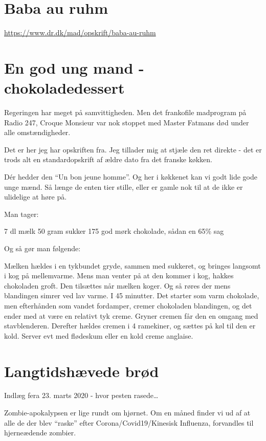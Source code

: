 \documentclass[
]{book}
\begin{document}
\hypertarget{baba-au-ruhm}{%
\section{Baba au ruhm}\label{baba-au-ruhm}}

\url{https://www.dr.dk/mad/opskrift/baba-au-ruhm}

\hypertarget{en-god-ung-mand---chokoladedessert}{%
\section{En god ung mand - chokoladedessert}\label{en-god-ung-mand---chokoladedessert}}

Regeringen har meget på samvittigheden. Men det frankofile madprogram på Radio 247, Croque Monsieur var nok stoppet med Master Fatmans død under alle omstændigheder.

Det er her jeg har opskriften fra. Jeg tillader mig at stjæle den ret direkte - det er trods alt en standardopskrift af ældre dato fra det franske køkken.

Dér hedder den ``Un bon jeune homme''. Og her i køkkenet kan vi godt lide gode unge mænd. Så længe de enten tier stille, eller er gamle nok til at de ikke er ulidelige at høre på.

Man tager:

7 dl mælk
50 gram sukker
175 god mørk chokolade, sådan en 65\% sag

Og så gør man følgende:

Mælken hældes i en tykbundet gryde, sammen med sukkeret, og bringes langsomt i kog på mellemvarme.
Mens man venter på at den kommer i kog, hakkes chokoladen groft. Den tilsættes når mælken koger.
Og så røres der mens blandingen simrer ved lav varme. I 45 minutter.
Det starter som varm chokolade, men efterhånden som vandet fordamper, cremer chokoladen blandingen, og det ender med at være en relativt tyk creme.
Gryner cremen får den en omgang med stavblenderen.
Derefter hældes cremen i 4 ramekiner, og sættes på køl til den er kold.
Server evt med flødeskum eller en kold creme anglaise.

\hypertarget{langtidshuxe6vede-bruxf8d}{%
\section{Langtidshævede brød}\label{langtidshuxe6vede-bruxf8d}}

Indlæg fera 23. marts 2020 - hvor pesten rasede\ldots{}

Zombie-apokalypsen er lige rundt om hjørnet. Om en måned finder vi ud af at alle de der blev ``raske'' efter Corona/Covid19/Kinesisk Influenza, forvandles til hjerneædende zombier.
\end{document}
